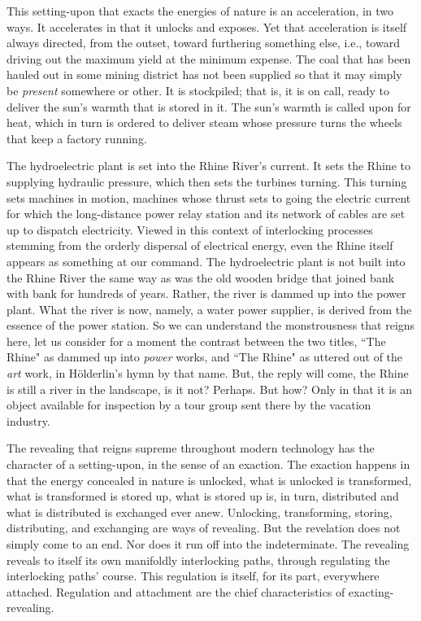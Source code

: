\documentclass[paper=a4, fontsize=11pt,twoside]{scrartcl}
\begin{document}
This setting-upon that exacts the energies of nature is an acceleration, in two ways. It accelerates in that it unlocks and exposes. Yet that acceleration is itself always directed, from the outset, toward furthering something else, i.e., toward driving out the maximum yield at the minimum expense. The coal that has been hauled out in some mining district has not been supplied so that it may simply be \textit{present} somewhere or other. It is stockpiled; that is, it is on call, ready to deliver the sun's warmth that is stored in it. The sun's warmth is called upon for heat, which in turn is ordered to deliver steam whose pressure turns the wheels that keep a factory running.

The hydroelectric plant is set into the Rhine River's current. It sets the Rhine to supplying hydraulic pressure, which then sets the turbines turning. This turning sets machines in motion, machines whose thrust sets to going the electric current for which the long-distance power relay station and its network of cables are set up to dispatch electricity. Viewed in this context of interlocking processes stemming from the orderly dispersal of electrical energy, even the Rhine itself appears as something at our command. The hydroelectric plant is not built into the Rhine River the same way as was the old wooden bridge that joined bank with bank for hundreds of years. Rather, the river is dammed up into the power plant. What the river is now, namely, a water power supplier, is derived from the essence of the power station. So we can understand the monstrousness that reigns here, let us consider for a moment the contrast between the two titles, ``The Rhine" as dammed up into \textit{power} works, and ``The Rhine" as uttered out of the \textit{art} work, in H{\"o}lderlin's hymn by that name. But, the reply will come, the Rhine is still a river in the landscape, is it not? Perhaps. But how? Only in that it is an object available for inspection by a tour group sent there by the vacation industry.

The revealing that reigns supreme throughout modern technology has the character of a setting-upon, in the sense of an exaction. The exaction happens in that the energy concealed in nature is unlocked, what is unlocked is transformed, what is transformed is stored up, what is stored up is, in turn, distributed and what is distributed is exchanged ever anew. Unlocking, transforming, storing, distributing, and exchanging are ways of revealing. But the revelation does not simply come to an end. Nor does it run off into the indeterminate. The revealing reveals to itself its own manifoldly interlocking paths, through regulating the interlocking paths' course. This regulation is itself, for its part, everywhere attached. Regulation and attachment are the chief characteristics of exacting-revealing.
\end{document}
